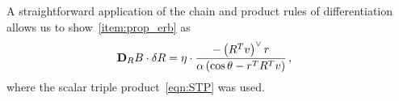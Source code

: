 \documentclass[letterpaper, 10 pt, conference]{ieeeconf}  %
\begin{document}
A straightforward application of the chain and product rules of differentiation allows us to show~\cref{item:prop_erb} as
\begin{align*}
	\mathbf{D}_{R} B \cdot \delta R &=  \eta \cdot \frac{ - \left( R^T v\right)^\vee r}{\alpha \left(\cos \theta - r^T R^T v \right)} \, ,
\end{align*}
where the scalar triple product~\cref{eqn:STP} was used.

\end{document}
